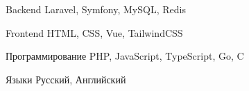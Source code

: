 
\begin{cvskills}

  \cvskill
    {Backend} %
    {Laravel, Symfony, MySQL, Redis} %

  \cvskill
    {Frontend} %
    {HTML, CSS, Vue, TailwindCSS} %

  \cvskill
    {Программирование} %
    {PHP, JavaScript, TypeScript, Go, C} %

  \cvskill
    {Языки} %
    {Русский, Английский} %

\end{cvskills}
